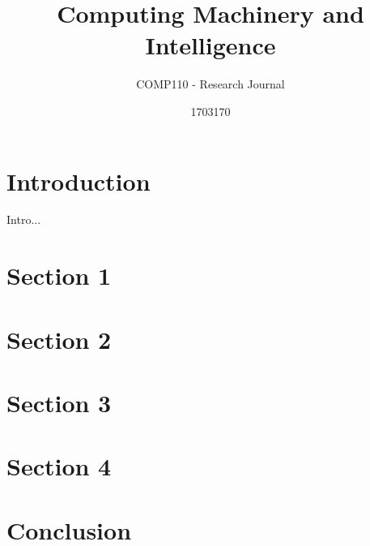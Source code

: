 \documentclass{scrartcl}
\title{Computing Machinery and Intelligence
}
\subtitle{COMP110 - Research Journal}
\author{1703170}
\begin{document}
\maketitle


\section{Introduction}

Intro...



\section{Section 1}




\section{Section 2}



\section{Section 3}



\section{Section 4}




\section{Conclusion}





\end{document}
